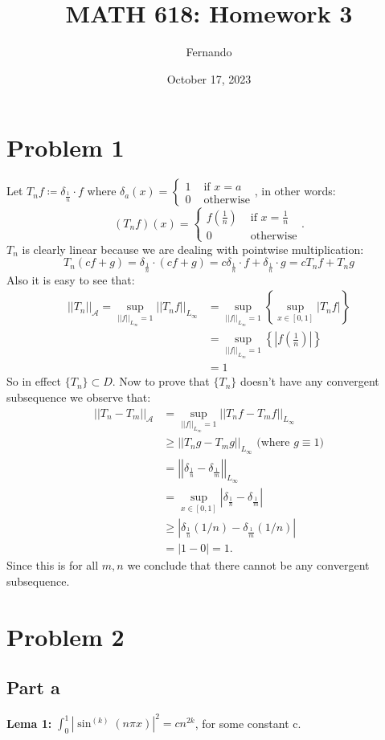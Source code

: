 \documentclass{article}
\title{MATH 618: Homework 3}
\author{Fernando}
\date{October 17, 2023}
\begin{document}
\maketitle
\section{Problem 1}
Let $T_nf\coloneqq\delta_{\frac{1}{n}}\cdot f$ where $\delta_{a}(x)=\begin{cases}
1 &\text{ if } x=a\\
0 &\text{ otherwise}
\end{cases}$, in other words:
\[ (T_nf)(x)=\begin{cases}
f(\frac{1}{n}) &\text{ if } x=\frac{1}{n}\\
0 &\text{ otherwise}
\end{cases}.
\]
$T_n$ is clearly linear because we are dealing with pointwise multiplication:
\[
T_n(cf+g)=\delta_{\frac{1}{n}}\cdot(cf+g)=c\delta_{\frac{1}{n}}\cdot
f+\delta_{\frac{1}{n}}\cdot g=cT_nf+T_ng
\]
Also it is easy to see that:
\begin{align*}
||T_n||_{\mathcal{A}}=\sup_{||f||_{L_\infty}=1}||T_nf||_{L_\infty}
&=\sup_{||f||_{L_\infty}=1} \left\{\sup_{x\in[0,1]}|T_nf|\right\}\\
&=\sup_{||f||_{L_\infty}=1} \left\{\left|f\left(\frac{1}{n}\right)\right|\right\}\\
&= 1
\end{align*}
So in effect $\{T_n\}\subset D$.
Now to prove that $\{T_n\}$ doesn't have any convergent subsequence we observe
that:
\begin{align*}
||T_n-T_m||_{\mathcal{A}}
&=\sup_{||f||_{L_\infty}=1}||T_nf-T_mf||_{L_\infty}\\
&\geq||T_ng-T_mg||_{L_\infty}\text{ (where $g\equiv 1$)}\\
&=\left|\left|\delta_{\frac{1}{n}}-\delta_{\frac{1}{m}}\right|\right|_{L_\infty}\\
&=\sup_{x\in[0,1]}\left|\delta_{\frac{1}{n}}-\delta_{\frac{1}{m}}\right|\\
&\geq \left|\delta_{\frac{1}{n}}(1/n)-\delta_{\frac{1}{m}}({1/n})\right|\\
&=|1-0|=1.
\end{align*}
Since this is for all $m,n$ we conclude that there cannot be any convergent
subsequence.
\section{Problem 2}
\subsection{Part a}
\textbf{Lema 1:} $\int_0^1 |\sin^{(k)}(n\pi x)|^2=cn^{2k}$, for
some constant c.
\end{document}
